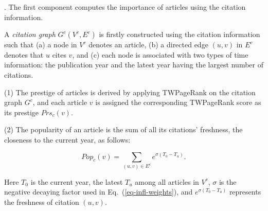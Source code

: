 









.
The first component computes the importance of articles using the citation information.

A {\em citation graph} $G^c(V^c, E^c)$ is firstly constructed using the citation information such that (a) a node in $V^c$ denotes an article, (b) a directed edge $(u,v)$ in $E^c$ denotes that $u$ cites $v$, and (c) each node is associated with two types of time information: the publication year and the latest year having the largest number of citations.


\sstab(1) The prestige of articles is derived by applying TWPageRank on the citation graph $G^c$, and each article $v$ is assigned the corresponding TWPageRank score as its prestige $Prs_c(v)$.

\sstab(2)  The popularity of an article is the sum of all its citations' freshness, \ie the closeness to the current year, as follows:
\begin{small}
\begin{equation}\label{eq-pop}
Pop_c(v) = \sum_{{(u,v)\in E^c}} {e^{\sigma (T_0-T_u)}}.
\end{equation}
\end{small}
\noindent
Here $T_0$ is the current year, \ie the latest $T_u$ among all articles in $V^c$, $\sigma$ is the negative decaying factor used in Eq.~(\ref{eq-infl-weights}), and $e^{\sigma (T_0-T_u)}$ represents the freshness of citation $(u,v)$.

